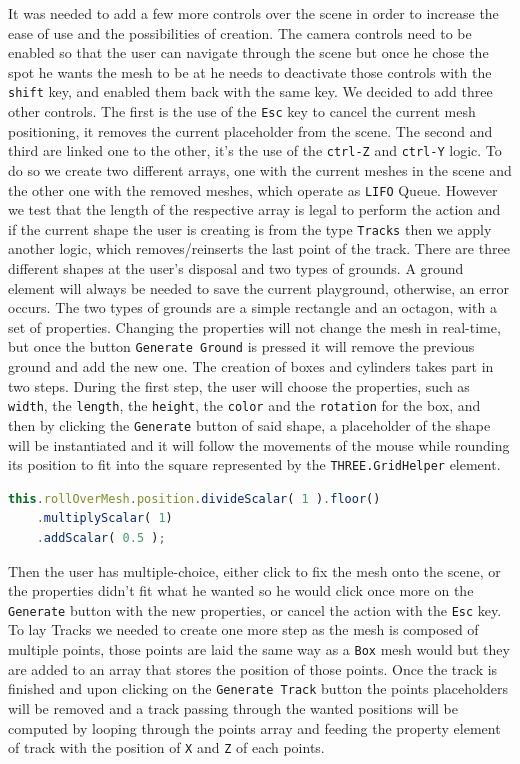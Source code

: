 \documentclass{scrbook}
\begin{document}
It was needed to add a few more controls over the scene in order to increase the ease of use and the possibilities of creation. The camera controls need to be enabled so that the user can navigate through the scene but once he chose the spot he wants 
the mesh to be at he needs to deactivate those controls with the \texttt{shift} key, and enabled them back with the same key. We decided to add three other controls. The first is the use of the \texttt{Esc} key to cancel the current mesh positioning, it removes the current placeholder from the scene. 
The second and third are linked one to the other, it's the use of the \texttt{ctrl-Z} and \texttt{ctrl-Y} logic. To do so we create two different arrays, one with the current meshes in the scene and the other one with the removed meshes, which operate as \texttt{LIFO} Queue.
However we test that the length of the respective array is legal to perform the action and if the current shape the user is creating is from the type \texttt{Tracks} then we apply another logic, which removes/reinserts the last point of the track.
There are three different shapes at the user's disposal and two types of grounds. A ground element will always be needed to save the current playground, otherwise, an error occurs. The two types of grounds are a simple rectangle and an octagon, with a set of properties. 
Changing the properties will not change the mesh in real-time, but once the button \texttt{Generate Ground} is pressed it will remove the previous ground and add the new one. The creation of boxes and cylinders takes part in two steps. 
During the first step, the user will choose the properties, such as \texttt{width}, the \texttt{length}, the \texttt{height}, the \texttt{color} and the \texttt{rotation} for the box, and then by clicking the \texttt{Generate} button of said shape, 
a placeholder of the shape will be instantiated and it will follow the movements of the mouse while rounding its position to fit into the square represented by the \texttt{THREE.GridHelper} element. 

\begin{lstlisting}[language=JavaScript, gobble=2, basicstyle=\ttfamily\small]
  this.rollOverMesh.position.divideScalar( 1 ).floor()
    .multiplyScalar( 1)
    .addScalar( 0.5 );
\end{lstlisting} 

Then the user has multiple-choice, either click to fix the mesh onto the scene, or the properties didn't fit what he wanted so he would click once more on the \texttt{Generate} button with the new properties, 
or cancel the action with the \texttt{Esc} key. 
To lay Tracks we needed to create one more step as the mesh is composed of multiple points, those points are laid the same way as a \texttt{Box} mesh would but they are added to an array that stores the position of those points. 
Once the track is finished and upon clicking on the \texttt{Generate Track} button the points placeholders will be removed and a track passing through the wanted positions will be computed by looping through the points array and feeding the property element of track with the position of \texttt{X} and \texttt{Z} of each points.
\end{document}
